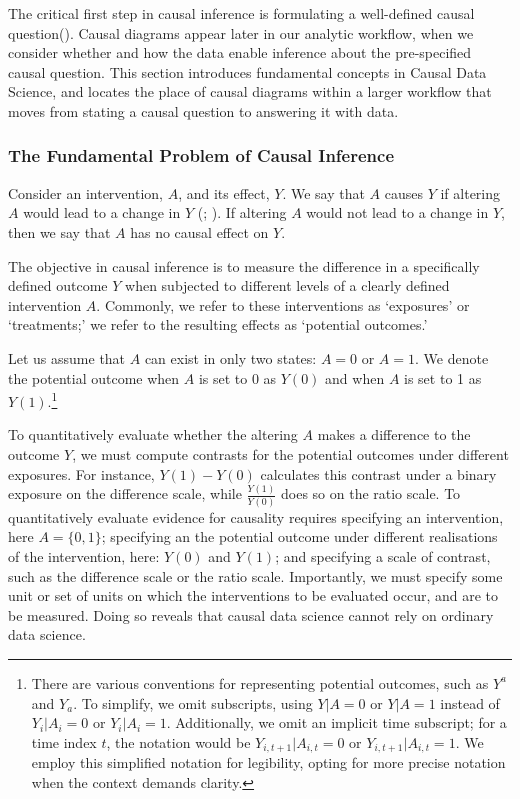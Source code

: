 \documentclass[
  singlecolumn,
  9pt]{article}
\begin{document}
The critical first step in causal inference is formulating a
well-defined causal question(). Causal diagrams appear later in our analytic
workflow, when we consider whether and how the data enable inference
about the pre-specified causal question. This section introduces
fundamental concepts in Causal Data Science, and locates the place of
causal diagrams within a larger workflow that moves from stating a
causal question to answering it with data.

\subsubsection{The Fundamental Problem of Causal
Inference}\label{the-fundamental-problem-of-causal-inference}

Consider an intervention, \(A\), and its effect, \(Y\). We say that
\(A\) causes \(Y\) if altering \(A\) would lead to a change in \(Y\)
(; ). If altering \(A\) would not lead to a change in \(Y\), then we
say that \(A\) has no causal effect on \(Y\).

The objective in causal inference is to measure the difference in a
specifically defined outcome \(Y\) when subjected to different levels of
a clearly defined intervention \(A\). Commonly, we refer to these
interventions as `exposures' or `treatments;' we refer to the resulting
effects as `potential outcomes.'

Let us assume that \(A\) can exist in only two states: \(A = 0\) or
\(A = 1\). We denote the potential outcome when \(A\) is set to 0 as
\(Y(0)\) and when \(A\) is set to 1 as \(Y(1)\).\footnote{There are
  various conventions for representing potential outcomes, such as
  \(Y^a\) and \(Y_a\). To simplify, we omit subscripts, using
  \(Y|A = 0\) or \(Y|A = 1\) instead of \(Y_i|A_i = 0\) or
  \(Y_i|A_i = 1\). Additionally, we omit an implicit time subscript; for
  a time index \(t\), the notation would be \(Y_{i,t+1}|A_{i,t} = 0\) or
  \(Y_{i,t+1}|A_{i,t} = 1\). We employ this simplified notation for
  legibility, opting for more precise notation when the context demands
  clarity.}

To quantitatively evaluate whether the altering \(A\) makes a difference
to the outcome \(Y\), we must compute contrasts for the potential
outcomes under different exposures. For instance, \(Y(1) - Y(0)\)
calculates this contrast under a binary exposure on the difference
scale, while \(\frac{Y(1)}{Y(0)}\) does so on the ratio scale. To
quantitatively evaluate evidence for causality requires specifying an
intervention, here \(A = \{0,1\}\); specifying an the potential outcome
under different realisations of the intervention, here: \(Y(0)\) and
\(Y(1)\); and specifying a scale of contrast, such as the difference
scale or the ratio scale. Importantly, we must specify some unit or set
of units on which the interventions to be evaluated occur, and are to be
measured. Doing so reveals that causal data science cannot rely on
ordinary data science.
\end{document}
